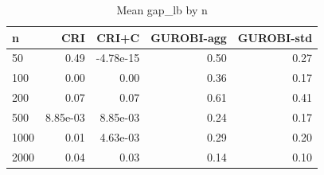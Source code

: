 \begin{table}[htbp]
\centering
\small
\caption{Mean gap\_lb by n}
\label{tab:E3_long_runs_b600_by_n}
\begin{tabular}{lrrrr}
\toprule
n & CRI & CRI+C & GUROBI-agg & GUROBI-std \\
\midrule
50 & 0.49 & -4.78e-15 & 0.50 & 0.27 \\
100 & 0.00 & 0.00 & 0.36 & 0.17 \\
200 & 0.07 & 0.07 & 0.61 & 0.41 \\
500 & 8.85e-03 & 8.85e-03 & 0.24 & 0.17 \\
1000 & 0.01 & 4.63e-03 & 0.29 & 0.20 \\
2000 & 0.04 & 0.03 & 0.14 & 0.10 \\
\bottomrule
\end{tabular}
\end{table}
